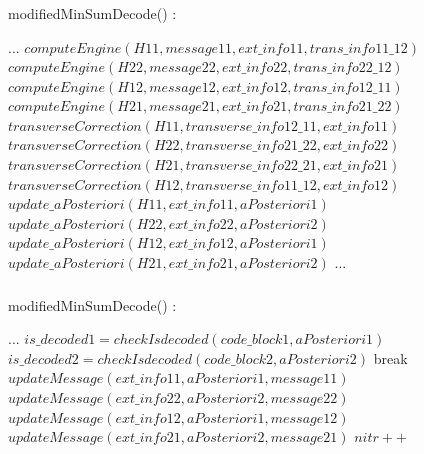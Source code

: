 \documentclass[xcolor=dvipsname]
{beamer}
\begin{document}
\begin{frame}[t]
\frametitle{  }                                 %
\alert{ modifiedMinSumDecode()	: }
\begin{algorithmic}   
\STATE ...               
\STATE$computeEngine(H11,message11,ext\_info11,trans\_info11\_12)$
\STATE$computeEngine(H22,message22,ext\_info22,trans\_info22\_12)$
\STATE$computeEngine(H12,message12,ext\_info12,trans\_info12\_11)$
\STATE$computeEngine(H21,message21,ext\_info21,trans\_info21\_22)$
\STATE$transverseCorrection(H11,transverse\_info12\_11,ext\_info11)$
\STATE$transverseCorrection(H22,transverse\_info21\_22,ext\_info22)$
\STATE$transverseCorrection(H21,transverse\_info22\_21,ext\_info21)$
\STATE$transverseCorrection(H12,transverse\_info11\_12,ext\_info12)$
\STATE$update\_aPosteriori (H11 , ext\_info11 ,aPosteriori1)$
\STATE$update\_aPosteriori (H22 , ext\_info22 ,aPosteriori2)$
\STATE$update\_aPosteriori (H12 , ext\_info12 ,aPosteriori1)$
\STATE$update\_aPosteriori (H21 , ext\_info21 ,aPosteriori2)$
\STATE ...
     	
 \ENDWHILE    


  		
\end{algorithmic}
\end{frame}


\begin{frame}[t]
\frametitle{  }                                 %
\alert{ modifiedMinSumDecode()	: }
\begin{algorithmic}   
\STATE ...  
\STATE$is\_decoded1 = checkIsdecoded( code\_block1 , aPosteriori1 ) $
\STATE$is\_decoded2 = checkIsdecoded( code\_block2 , aPosteriori2 ) $              
        	\STATE break 
    	\ELSE
        	\STATE $updateMessage(ext\_info11 ,aPosteriori1 ,message11)$
        	\STATE $updateMessage(ext\_info22 ,aPosteriori2 ,message22)$
        	\STATE $updateMessage(ext\_info12 ,aPosteriori1 ,message12)$
        	\STATE $updateMessage(ext\_info21 ,aPosteriori2 ,message21)$
     	\ENDIF 
\STATE $nitr++$  
 \ENDWHILE    


  		
\end{algorithmic}
\end{frame}
\end{document}
